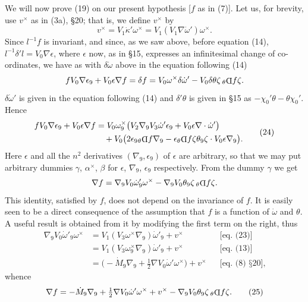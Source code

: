 \documentclass[11pt]{article}
\newcommand{\invd}{\mathord{\vcenter{\hbox{\rotatebox[origin=c]{180}{\(\mathrm{D}\)}}}}}
\newcommand{\thetaPi}{{}_\theta\invd}
\begin{document}
\indent We will now prove (19) on our present hypothesis [$f$ as in (7)]. Let us, for brevity, use $v^\times$ as in (3a), §20; that is, we define $v^\times$ by
\begin{equation}
  v^\times=V_1\dot\kappa'\omega^\times=V_1(V_1\nabla\dot\omega')\omega^\times.
  \tag{23}
\end{equation}
Since $l^{-1}f$ is invariant, and since, as we saw above, before equation (14), $l^{-1}\delta'l=V_0\nabla\epsilon$, where $\epsilon$ now, as in §15, expresses an infinitesimal change of co-ordinates, we have as with $\delta\dot\omega$ above in the equation following (14)
\[
  fV_0\nabla\epsilon_9+V_0\epsilon\nabla f=\delta f
  =V_0\omega^\times\delta\dot\omega'-V_0\delta\theta\zeta\,\thetaPi f\zeta.
\]
$\delta\dot\omega'$ is given in the equation following (14) and $\delta'\theta$ is given in §15 as $-\chi_0'\theta-\theta\chi_0'$. Hence
\begin{equation}
  \begin{aligned}
    fV_0\nabla\epsilon_9+V_0\epsilon\nabla f
    &=V_0\omega_9^\times\bigl(V_2\nabla_9V_3\dot\omega'\epsilon_9+V_0\epsilon\nabla\mathbin{\cdot}\dot\omega'\bigr)\\
    &\quad+V_0\bigl(2\epsilon_9\thetaPi f\nabla_9-\epsilon\thetaPi f\zeta\theta_9\zeta\mathbin{\cdot}V_0\epsilon\nabla_9\bigr).
  \end{aligned}
  \tag{24}
\end{equation}
Here $\epsilon$ and all the $n^2$ derivatives $(\nabla_9,\epsilon_9)$ of $\epsilon$ are arbitrary, so that we may put arbitrary dummies $\gamma$, $\alpha^\times$, $\beta$ for $\epsilon$, $\nabla_9$, $\epsilon_9$ respectively. From the dummy $\gamma$ we get
\[
  \nabla f=\nabla_9V_0\dot\omega'_9\omega^\times-\nabla_9V_0\theta_9\zeta\,\thetaPi f\zeta.
\]
This identity, satisfied by $f$, does not depend on the invariance of $f$. It is easily seen to be a direct consequence of the assumption that $f$ is a function of $\dot\omega$ and $\theta$. A useful result is obtained from it by modifying the first term on the right, thus
\[
  \begin{aligned}
    \nabla_9V_0\dot\omega'_9\omega^\times
    &=V_1(V_3\omega^\times\nabla_9)\dot\omega'_9+v^\times &&\text{[eq. (23)]}\\
    &=V_1(V_3\omega_9^\times\nabla_9)\dot\omega'_9+v^\times &&\text{[eq. (13)]}\\
    &=\bigl(-\dot M_9\nabla_9+\tfrac12\nabla V_0\dot\omega'\omega^\times\bigr)+v^\times &&\text{[eq. (8) §20]},
  \end{aligned}
\]
whence
\begin{equation}
  \nabla f=-\dot M_9\nabla_9+\tfrac12\nabla V_0\dot\omega'\omega^\times+v^\times-\nabla_9V_0\theta_9\zeta\,\thetaPi f\zeta.
  \tag{25}
\end{equation}
\end{document}
